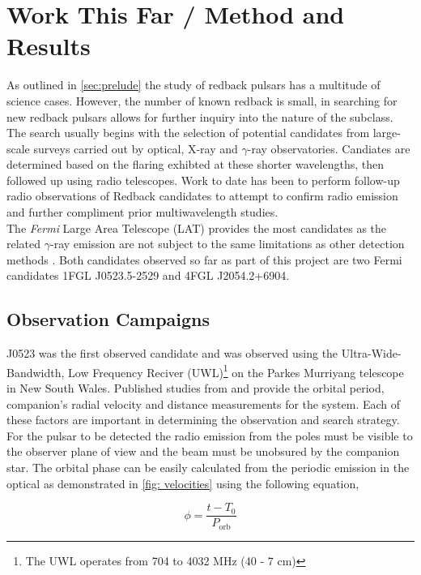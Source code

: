 \section{Work This Far / Method and Results}

As outlined in \cref{sec:prelude} the study of redback pulsars has a multitude of science cases. However, the number of known redback is small, in searching for new redback pulsars allows for further inquiry into the nature of the subclass. The search usually begins with the selection of potential candidates from large-scale surveys carried out by optical, X-ray and $\gamma$-ray observatories. Candiates are determined based on the flaring exhibted at these shorter wavelengths, then followed up using radio telescopes. Work to date has been to perform follow-up radio observations of Redback candidates to attempt to confirm radio emission and further compliment prior multiwavelength studies. \\ 

The \textit{Fermi} Large Area Telescope (LAT) provides the most candidates as the related $\gamma$-ray emission are not subject to the same limitations as other detection methods \citep{ray_radio_2012}. Both candidates observed so far as part of this project are two Fermi candidates 1FGL J0523.5-2529 and 4FGL J2054.2+6904. 

\subsection{Observation Campaigns}

J0523 was the first observed candidate and was observed using the Ultra-Wide-Bandwidth, Low Frequency Reciver (UWL)\footnote{The UWL operates from 704 to 4032 MHz (40 - 7 cm)} on the Parkes Murriyang telescope in New South Wales. Published studies from \cite{strader_1fgl_2014} and \cite{halpern_luminous_2022} provide the orbital period, companion's radial velocity and distance measurements for the system. Each of these factors are important in determining the observation and search strategy. \\ 

For the pulsar to be detected the radio emission from the poles must be visible to the observer plane of view and the beam must be unobsured by the companion star. The orbital phase can be easily calculated from the periodic emission in the optical as demonstrated in \cref{fig: velocities} using the following equation, 

\begin{equation}
    \phi = \frac{t - T_0}{P_{\text{orb}}}
    \label{eq: orbital phase}
\end{equation}

